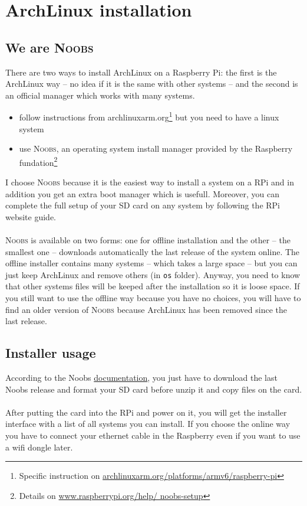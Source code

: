 \chapter{ArchLinux installation}
\section{We are \textsc{Noobs}}
There are two ways to install ArchLinux on a Raspberry Pi: the first is 
the ArchLinux way -- no idea if it is the same with other systems -- and 
the second is an official manager which works with many systems.

\begin{itemize}
	\item follow instructions from archlinuxarm.org\footnote{Specific 
		  instruction on \href{http://archlinuxarm.org/platforms/armv6/
		  raspberry-pi}{archlinuxarm.org/platforms/armv6/raspberry-pi}} but 
		  you need to have a linux system
		  
	\item use \textsc{Noobs}, an operating system install manager provided by 
		  the Raspberry fundation\footnote{Details on \href{http://
		  www.raspberrypi.org/help/noobs-setup}{www.raspberrypi.org/help/
		  noobs-setup}}\\
\end{itemize}

I choose \textsc{Noobs} because it is the easiest way to install a
system on a RPi and in addition you get an extra \og{}boot manager\fg{} which 
is usefull. Moreover, you can complete the full setup of your SD card on any 
system by following the RPi website guide.
\\\\
\textsc{Noobs} is available on two forms: one for offline installation 
and the other -- the smallest one -- downloads automatically the last release 
of the system online. The offline installer contains many systems -- which 
takes a large space -- but you can just keep ArchLinux and remove others 
(in \texttt{os} folder). Anyway, you need to know that other systems files 
will be keeped after the installation so it is loose space. If you still want 
to use the offline way because you have no choices, you will have to find  
an older version of \textsc{Noobs} because ArchLinux has been removed since  
the last release.

\section{Installer usage}
According to the Noobs \href{http://www.raspberrypi.org/help/noobs-setup}
{documentation}, you just have to download the last Noobs release and format 
your SD card before unzip it and copy files on the card.
\\\\
After putting the card into the RPi and power on it, you will get the 
installer interface with a list of all systems you can install. If you choose 
the online way you have to connect your ethernet cable in the Raspberry even 
if you want to use a wifi dongle later.

